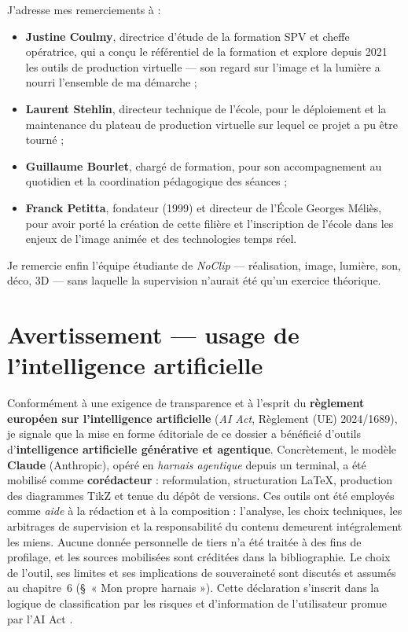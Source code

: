 \documentclass[11pt,a4paper]{report}
\begin{document}
\medskip
J'adresse mes remerciements à :
\begin{itemize}
\item \textbf{Justine Coulmy}, directrice d'étude de la formation SPV et cheffe opératrice, qui a conçu le référentiel de la formation et explore depuis 2021 les outils de production virtuelle --- son regard sur l'image et la lumière a nourri l'ensemble de ma démarche ;
\item \textbf{Laurent Stehlin}, directeur technique de l'école, pour le déploiement et la maintenance du plateau de production virtuelle sur lequel ce projet a pu être tourné ;
\item \textbf{Guillaume Bourlet}, chargé de formation, pour son accompagnement au quotidien et la coordination pédagogique des séances ;
\item \textbf{Franck Petitta}, fondateur (1999) et directeur de l'École Georges Méliès, pour avoir porté la création de cette filière et l'inscription de l'école dans les enjeux de l'image animée et des technologies temps réel.
\end{itemize}

\medskip
Je remercie enfin l'équipe étudiante de \textit{NoClip} --- réalisation, image, lumière, son, déco, 3D --- sans laquelle la supervision n'aurait été qu'un exercice théorique.

\chapter*{Avertissement --- usage de l'intelligence artificielle}
\begin{notebox}[title={Transparence sur l'usage d'outils d'intelligence artificielle}]
Conformément à une exigence de transparence et à l'esprit du \textbf{règlement européen sur l'intelligence artificielle} (\emph{AI Act}, Règlement (UE) 2024/1689), je signale que la mise en forme éditoriale de ce dossier a bénéficié d'outils d'\textbf{intelligence artificielle générative et agentique}. Concrètement, le modèle \textbf{Claude} (Anthropic), opéré en \emph{harnais agentique} depuis un terminal, a été mobilisé comme \textbf{corédacteur} : reformulation, structuration LaTeX, production des diagrammes TikZ et tenue du dépôt de versions. Ces outils ont été employés comme \emph{aide} à la rédaction et à la composition : l'analyse, les choix techniques, les arbitrages de supervision et la responsabilité du contenu demeurent intégralement les miens. Aucune donnée personnelle de tiers n'a été traitée à des fins de profilage, et les sources mobilisées sont créditées dans la bibliographie. Le choix de l'outil, ses limites et ses implications de souveraineté sont discutés et assumés au chapitre~6 (§~« Mon propre harnais »). Cette déclaration s'inscrit dans la logique de classification par les risques et d'information de l'utilisateur promue par l'AI Act \autocite{aiact2024}.
\end{notebox}
\end{document}
